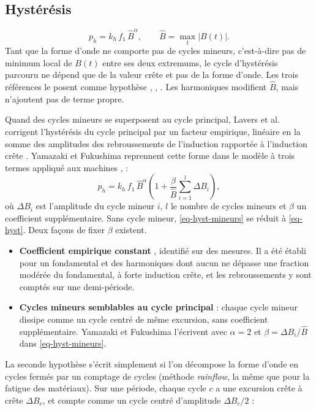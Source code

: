 \documentclass[11pt,a4paper]{article}
\newcommand{\Bc}{\hat{B}}
\begin{document}
\subsection{Hystérésis}
\begin{equation}
    p_h = k_h\, f_1\, \Bc^{\alpha}, \qquad \Bc = \max_t |B(t)|.
    \label{eq-hyst}
\end{equation}
Tant que la forme d'onde ne comporte pas de cycles mineurs, c'est-à-dire pas de minimum local de $B(t)$ entre ses deux extremums, le cycle d'hystérésis parcouru ne dépend que de la valeur crête et pas de la forme d'onde. Les trois références le posent comme hypothèse \cite[\S~II et Eq.~16]{Fio90}, \cite[\S~II]{Ama95}, \cite[Eq.~1 et 13]{Bog03}. Les harmoniques modifient $\Bc$, mais n'ajoutent pas de terme propre.

Quand des cycles mineurs se superposent au cycle principal, Lavers et al. corrigent l'hystérésis du cycle principal par un facteur empirique, linéaire en la somme des amplitudes des rebroussements de l'induction rapportée à l'induction crête \cite[Eq.~4 à 6]{Lav78}. Yamazaki et Fukushima reprennent cette forme dans le modèle à trois termes appliqué aux machines \cite[Eq.~1]{Yam10}, \cite[Eq.~I-22]{Car21} :
\begin{equation}
    p_h = k_h\, f_1\, \Bc^{\alpha}\left(1 + \frac{\beta}{\Bc}\sum_{i=1}^{l} \Delta B_i\right),
    \label{eq-hyst-mineurs}
\end{equation}
où $\Delta B_i$ est l'amplitude du cycle mineur $i$, $l$ le nombre de cycles mineurs et $\beta$ un coefficient supplémentaire. Sans cycle mineur, \eqref{eq-hyst-mineurs} se réduit à \eqref{eq-hyst}. Deux façons de fixer $\beta$ existent.
\begin{itemize}
    \item \textbf{Coefficient empirique constant} \cite{Lav78}, identifié sur des mesures. Il a été établi pour un fondamental et des harmoniques dont aucun ne dépasse une fraction modérée du fondamental, à forte induction crête, et les rebroussements y sont comptés sur une demi-période.
    \item \textbf{Cycles mineurs semblables au cycle principal} \cite[\S~II-B et III-A]{Yam10} : chaque cycle mineur dissipe comme un cycle centré de même excursion, sans coefficient supplémentaire. Yamazaki et Fukushima l'écrivent avec $\alpha = 2$ et $\beta = \Delta B_i/\Bc$ dans \eqref{eq-hyst-mineurs}.
\end{itemize}
La seconde hypothèse s'écrit simplement si l'on décompose la forme d'onde en cycles fermés par un comptage de cycles (méthode \emph{rainflow}, la même que pour la fatigue des matériaux). Sur une période, chaque cycle $c$ a une excursion crête à crête $\Delta B_c$, et compte comme un cycle centré d'amplitude $\Delta B_c/2$ :
\end{document}
